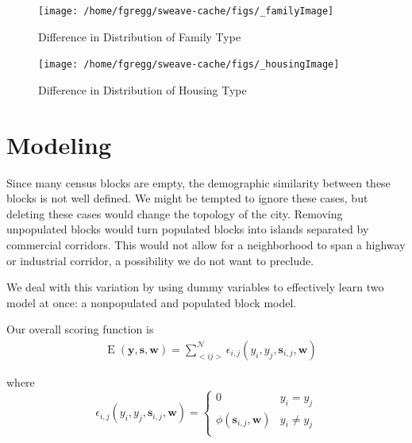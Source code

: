 \documentclass[12pt,letter]{article}\usepackage[]{graphicx}\usepackage[]{color}
\newenvironment{knitrout}{}{} %
\begin{document}
\begin{figure}
\begin{knitrout}
\color{fgcolor}

{\centering \texttt{[image: /home/fgregg/sweave-cache/figs/\_familyImage]} 

}



\end{knitrout}

\caption{Difference in Distribution of Family Type}
\end{figure}


\begin{figure}
\begin{knitrout}
\color{fgcolor}

{\centering \texttt{[image: /home/fgregg/sweave-cache/figs/\_housingImage]} 

}



\end{knitrout}

\caption{Difference in Distribution of Housing Type}
\end{figure}

\section*{Modeling}
Since many census blocks are empty, the demographic similarity between
these blocks is not well defined. We might be tempted to ignore these
cases, but deleting these cases would change the topology of the
city. Removing unpopulated blocks would turn populated blocks into
islands separated by commercial corridors. This would not allow for a
neighborhood to span a highway or industrial corridor, a possibility
we do not want to preclude.

We deal with this variation by using dummy variables to effectively
learn two model at once: a nonpopulated and populated block model.

Our overall scoring function is 
\begin{align}
&\operatorname{E}(\mathbf{y}, \mathbf{s}, \mathbf{w}) = \sum_{<i
    j>}^{\mathcal{N}}\epsilon_{i,j}(y_i, y_j, \mathbf{s}_{i,j}, \mathbf{w})  
\end{align}

where 
\begin{equation}
\epsilon_{i,j}(y_i, y_j, \mathbf{s}_{i,j}, \mathbf{w}) = \begin{cases}
    0 &y_i = y_j \\
    \phi(\mathbf{s}_{i,j}, \mathbf{w}) &y_i \neq y_j \\
  \end{cases}
\end{equation}
\end{document}
